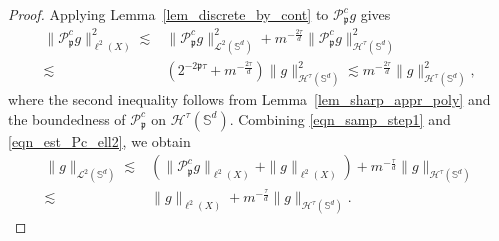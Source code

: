 \documentclass{article}
\numberwithin{equation}{section}
\def\SS{\mathbb{S}}
\def\pc{\mathcal{P}^c}
\begin{document}
\begin{proof}
Applying Lemma~\ref{lem_discrete_by_cont} to $\pc_{\mathfrak p}g$ gives
\begin{equation}\label{eqn_est_Pc_ell2}
    \begin{split}
        \|\pc_{\mathfrak p}g\|_{\ell^2(X)}^2
        \lesssim&\|\pc_{\mathfrak p}g\|_{\mathcal L^2(\SS^d)}^2
        +m^{-\frac{2\tau}{d}}\|\pc_{\mathfrak p}g\|_{\mathcal H^\tau(\SS^d)}^2\\
        \lesssim&\left(2^{-2\mathfrak p\tau}+m^{-\frac{2\tau}{d}}\right)
        \|g\|_{\mathcal H^\tau(\SS^d)}^2
        \lesssim m^{-\frac{2\tau}{d}}\|g\|_{\mathcal H^\tau(\SS^d)}^2,
    \end{split}
\end{equation}
where the second inequality follows from Lemma~\ref{lem_sharp_appr_poly} and the boundedness of $\pc_{\mathfrak p}$ on $\mathcal H^\tau(\SS^d)$. Combining \eqref{eqn_samp_step1} and \eqref{eqn_est_Pc_ell2}, we obtain
\begin{equation}\label{eqn:L2_by_discrete}
    \begin{split}
        \|g\|_{\mathcal L^2(\SS^d)}
        \lesssim&\left(\|\pc_{\mathfrak p}g\|_{\ell^2(X)}+\|g\|_{\ell^2(X)}\right)
        +m^{-\frac{\tau}{d}}\|g\|_{\mathcal H^\tau(\SS^d)}\\
        \lesssim&\|g\|_{\ell^2(X)}+m^{-\frac{\tau}{d}}\|g\|_{\mathcal H^\tau(\SS^d)}.
    \end{split}
\end{equation}


\end{proof}
\end{document}
